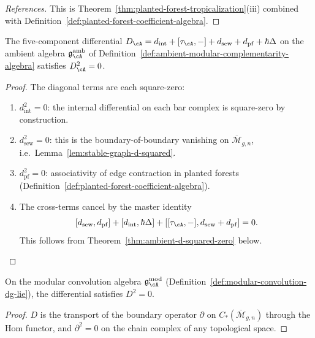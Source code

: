 \begin{proof}[References]
This is Theorem~\ref{thm:planted-forest-tropicalization}(iii)
combined with Definition~\ref{def:planted-forest-coefficient-algebra}.
\end{proof}

\begin{proposition}
\label{prop:coefficient-algebras-well-defined}
The five-component differential
$D_{\cA} = d_{\mathrm{int}} + [\tau_{\cA},-] + d_{\mathrm{sew}} +
d_{\mathrm{pf}} + \hbar\Delta$
on the ambient algebra
$\mathfrak{g}^{\mathrm{amb}}_{\cA}$ of
Definition~\textup{\ref{def:ambient-modular-complementarity-algebra}}
satisfies $D_{\cA}^2 = 0$.
\end{proposition}

\begin{proof}
The diagonal terms are each square-zero:
\begin{enumerate}[label=\textup{(\roman*)}]
\item $d_{\mathrm{int}}^2 = 0$: the internal differential on each bar
  complex is square-zero by construction.
\item $d_{\mathrm{sew}}^2 = 0$: this is the boundary-of-boundary
  vanishing on $\overline{\mathcal{M}}_{g,n}$, i.e.\
  Lemma~\ref{lem:stable-graph-d-squared}.
\item $d_{\mathrm{pf}}^2 = 0$: associativity of edge contraction in
  planted forests
  (Definition~\ref{def:planted-forest-coefficient-algebra}).
\item The cross-terms cancel by the master identity
  \[
    [d_{\mathrm{sew}}, d_{\mathrm{pf}}]
    + [d_{\mathrm{int}}, \hbar\Delta]
    + [[\tau_{\cA},-], d_{\mathrm{sew}} + d_{\mathrm{pf}}]
    = 0.
  \]
  This follows from Theorem~\ref{thm:ambient-d-squared-zero} below.
\end{enumerate}
\end{proof}

\begin{theorem}[Square-zero: convolution level; \ClaimStatusProvedHere]
\label{thm:convolution-d-squared-zero}
On the modular convolution algebra
$\mathfrak{g}_{\cA}^{\mathrm{mod}}$
\textup{(}Definition~\textup{\ref{def:modular-convolution-dg-lie})},
the differential satisfies $D^2 = 0$.
\end{theorem}

\begin{proof}
$D$ is the transport of the boundary operator $\partial$ on
$C_*(\overline{\mathcal{M}}_{g,n})$ through the Hom functor, and
$\partial^2 = 0$ on the chain complex of any topological space.
\end{proof}

